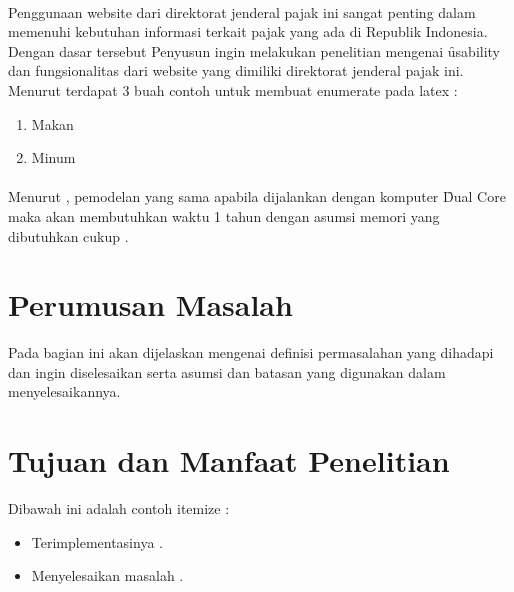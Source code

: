 \newline\\
Penggunaan website dari direktorat jenderal pajak ini sangat penting dalam memenuhi kebutuhan informasi terkait pajak yang ada di Republik Indonesia. Dengan dasar tersebut Penyusun ingin melakukan penelitian mengenai \f{usability} dan fungsionalitas dari website yang dimiliki direktorat jenderal pajak ini.
\newline\\
Menurut \citeauthor{book.buyya} terdapat 3 buah contoh untuk membuat enumerate pada latex \citep{book.buyya}: 
\begin{enumerate}
\item Makan
\item Minum
\end{enumerate}\paragraph{}

Menurut \cite{ppt.ecmwf}, pemodelan yang sama apabila dijalankan dengan komputer \f{Dual Core} maka akan membutuhkan waktu 1 tahun dengan asumsi memori yang dibutuhkan cukup \citep{ppt.ecmwf}.

\section{Perumusan Masalah}
Pada bagian ini akan dijelaskan mengenai definisi permasalahan yang dihadapi dan ingin diselesaikan serta asumsi dan batasan yang digunakan dalam menyelesaikannya.

\section{Tujuan dan Manfaat Penelitian}
Dibawah ini adalah contoh itemize : 
\begin{itemize}
\item Terimplementasinya .
\item Menyelesaikan masalah .
\end{itemize}
\paragraph{}

